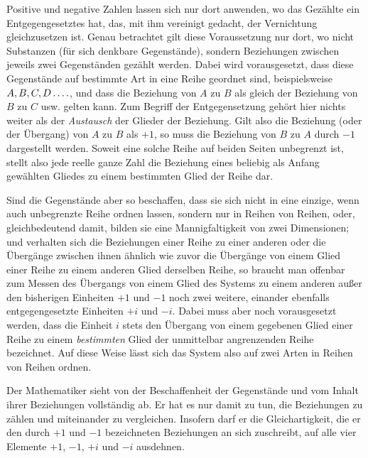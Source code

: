 Positive und negative Zahlen lassen sich nur dort anwenden, wo
das Gezählte ein Entgegengesetztes hat, das, mit ihm vereinigt gedacht, der Vernichtung gleichzusetzen ist. Genau betrachtet gilt diese Voraussetzung nur dort, wo nicht Substanzen (für sich denkbare Gegenstände), sondern Beziehungen zwischen jeweils zwei Gegenständen gezählt werden. Dabei wird vorausgesetzt, dass diese Gegenstände auf bestimmte Art in eine Reihe geordnet sind, beispielsweise $A,B,C,D\mathinner{.\,.\,.\,.}$, und dass die Beziehung von $A$ zu $B$ als gleich der Beziehung von $B$ zu $C$ usw. gelten kann. Zum Begriff der Entgegensetzung gehört hier nichts weiter als der \emph{Austausch} der Glieder der Beziehung. Gilt also die Beziehung (oder der Übergang) von $A$ zu $B$ als $+1$, so muss die Beziehung von $B$ zu $A$ durch $-1$ dargestellt werden. Soweit eine solche Reihe auf beiden Seiten unbegrenzt ist, stellt also jede reelle ganze Zahl die Beziehung eines beliebig als Anfang gewählten Gliedes zu einem bestimmten Glied der Reihe dar.

Sind die Gegenstände aber so beschaffen, dass sie sich nicht in eine einzige, wenn auch unbegrenzte Reihe ordnen lassen, sondern nur in Reihen von Reihen, oder, gleichbedeutend damit, bilden sie eine Mannigfaltigkeit von zwei Dimensionen; und verhalten sich die Beziehungen einer Reihe zu einer anderen oder die Übergänge zwischen ihnen ähnlich wie zuvor die Übergänge von einem Glied einer Reihe zu einem anderen Glied derselben Reihe, so braucht man offenbar zum Messen des Übergangs von einem Glied des Systems zu einem anderen außer den bisherigen Einheiten $+1$ und $-1$ noch zwei weitere, einander ebenfalls entgegengesetzte Einheiten $+i$ und $-i$. Dabei muss aber noch vorausgesetzt werden, dass die Einheit $i$ stets den Übergang von einem gegebenen Glied einer Reihe zu einem \emph{bestimmten} Glied der unmittelbar angrenzenden Reihe bezeichnet. Auf diese Weise lässt sich das System also auf zwei Arten in Reihen von Reihen ordnen.

Der Mathematiker sieht von der Beschaffenheit der Gegenstände und vom Inhalt ihrer Beziehungen vollständig ab. Er hat es nur damit zu tun, die Beziehungen zu zählen und miteinander zu vergleichen. Insofern darf er die Gleichartigkeit, die er den durch $+1$ und $-1$ bezeichneten Beziehungen an sich zuschreibt, auf alle vier Elemente $+1$, $-1$, $+i$ und $-i$ ausdehnen.

